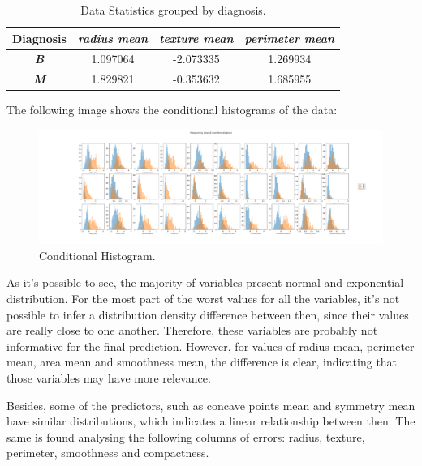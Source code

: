 \documentclass[conference]{IEEEtran}
\begin{document}
\begin{table}[htbp]
\caption{Data Statistics grouped by diagnosis.}
\begin{center}
\begin{tabular}{|c|c|c|c|}
    \hline
    \cline{2-4} 
    \textbf{Diagnosis} & \textbf{\textit{radius mean}}& \textbf{\textit{texture mean}}& \textbf{\textit{perimeter mean}} \\
    \hline
    \textbf{\textit{B}}& 1.097064 &-2.073335 &	1.269934  \\
    \hline
    \textbf{\textit{M}}& 1.829821 & -0.353632 & 1.685955 \\
    \hline
\end{tabular}
\label{tab:Statistics-by-diagnosis}
\end{center}
\end{table}

The following image shows the conditional histograms of the data:

\begin{figure}[htpb!]
    \centerline{\includegraphics[width=1.2 \textwidth]{../../code/hw1/figures/3-1-conditional-histogram.pdf}}
    \caption{Conditional Histogram.}
    \label{fig:3-1-conditional-histogram}
\end{figure}

As it's possible to see, the majority of variables present normal and exponential 
distribution. For the most part of the worst values for all the variables, it's not 
possible to infer a distribution density difference between then, since their values 
are really close to one another. Therefore, these variables are probably not 
informative for the final prediction. However, for values of radius mean, perimeter 
mean, area mean and smoothness mean, the difference is clear, indicating that 
those variables may have more relevance. 

Besides, some of the predictors, such as concave points mean and symmetry mean have 
similar distributions, which indicates a linear relationship between then. The same 
is found analysing the following columns of errors: radius, texture, perimeter, 
smoothness and compactness.
\end{document}
